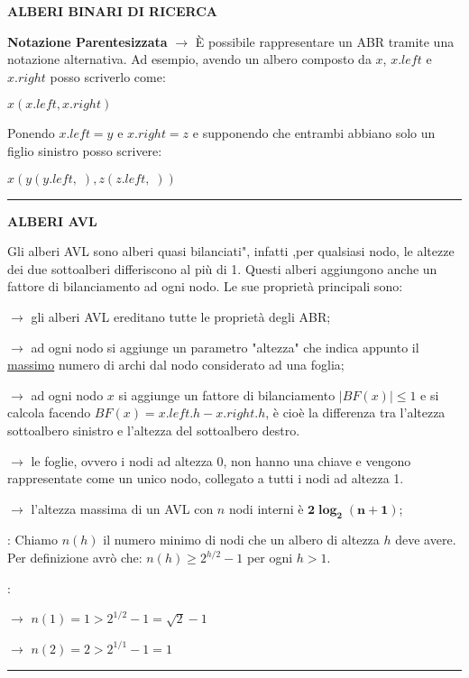 \documentclass[8pt]{extarticle}
\newenvironment{formulario}
{
\setlength{\columnsep}{3em}
\twocolumn
\lstset{tabsize=3}
\begin{spacing}{1}
\begin{flushleft}
}{
\end{flushleft}
\end{spacing}
}
\newenvironment{tcenter}{
  \par
  \centering
  \setlength{\parskip}{0pt} %
  \noindent
}{
  \par
}
\newenvironment{Descr}
{
	\begin{description}[topsep=0pt,itemsep=0pt,partopsep=0pt, parsep=0pt]
}{
	\end{description}
}
\newenvironment{myParagraph}[1]
{
\begin{tcenter}
\textbf{#1}
\end{tcenter}
}{
\myRule
}
\newcommand{\myRule}{\rule{250pt}{0.1pt}}
\newcommand{\bo}[1]{\textbf{#1}}
\newcommand{\ra}{\rightarrow}
\newcommand{\modulo}[1]{\left\vert #1 \right\vert}
\begin{document}
\begin{formulario}
\begin{myParagraph}{ALBERI BINARI DI RICERCA}
\bo{Notazione Parentesizzata} $\ra$ È possibile rappresentare un ABR tramite una notazione alternativa. Ad esempio, avendo un albero composto da $x$, $x.left$ e $x.right$ posso scriverlo come:\\
			\begin{tcenter}
$x(x.left,x.right)$
			\end{tcenter}
Ponendo $x.left=y$ e $x.right=z$ e supponendo che entrambi abbiano solo un figlio sinistro posso scrivere:
			\begin{tcenter}
$x(y(y.left,\;),z(z.left,\;))$
			\end{tcenter}
		\end{myParagraph}

	\begin{myParagraph}{ALBERI AVL}
Gli alberi AVL sono alberi quasi bilanciati", infatti ,per qualsiasi nodo, le altezze dei due sottoalberi differiscono al più di 1. Questi alberi aggiungono anche un fattore di bilanciamento ad ogni nodo. Le sue proprietà principali sono:
		\begin{Descr}
			\item[Proprietà ereditate dagli ABR] $\ra$ gli alberi AVL ereditano tutte le proprietà degli ABR;
			\item[Altezza dei Nodi] $\ra$ ad ogni nodo si aggiunge un parametro "altezza" che indica appunto il \underline{massimo} numero di archi dal nodo considerato ad una foglia;
			\item[Fattore di Bilanciamento] $\ra$ ad ogni nodo $x$ si aggiunge un fattore di bilanciamento $\modulo{BF(x)}\leq 1$ e si calcola facendo $BF(x)=x.left.h-x.right.h$, è cioè la differenza tra l'altezza sottoalbero sinistro e l'altezza del sottoalbero destro.
			\item[Sentinella T.NIL] $\ra$ le foglie, ovvero i nodi ad altezza 0, non hanno una chiave e vengono rappresentate come un unico nodo, collegato a tutti i nodi ad altezza 1.
			\item[Altezza Massima] $\ra$ l'altezza massima di un AVL con $n$ nodi interni è $\bm{2\log_2 (n+1)}$;
			\begin{Descr}
				\item[Teorema]: Chiamo $n(h)$ il numero minimo di nodi che un albero di altezza $h$ deve avere. Per definizione avrò che: $n(h)\geq 2^{h/2}-1$ per ogni $h>1$.
				\item[Dimostrazione]:
				\begin{Descr}
					\item[h=1] $\ra$ $n(1)=1 > 2^{1/2}-1=\sqrt{2}-1$
					\item[h=2] $\ra$ $n(2)=2 > 2^{1/1}-1=1$

\end{Descr}
\end{Descr}
\end{Descr}
\end{myParagraph}
\end{formulario}
\end{document}
